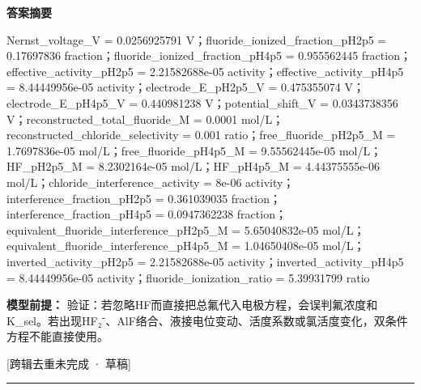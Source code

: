 \documentclass[UTF8,11pt,a4paper]{ctexart}
\begin{document}
\noindent\textbf{答案摘要}\par
Nernst\_voltage\_V = 0.0256925791 V；fluoride\_ionized\_fraction\_pH2p5 = 0.17697836 fraction；fluoride\_ionized\_fraction\_pH4p5 = 0.955562445 fraction；effective\_activity\_pH2p5 = 2.21582688e-05 activity；effective\_activity\_pH4p5 = 8.44449956e-05 activity；electrode\_E\_pH2p5\_V = 0.475355074 V；electrode\_E\_pH4p5\_V = 0.440981238 V；potential\_shift\_V = 0.0343738356 V；reconstructed\_total\_fluoride\_M = 0.0001 mol/L；reconstructed\_chloride\_selectivity = 0.001 ratio；free\_fluoride\_pH2p5\_M = 1.7697836e-05 mol/L；free\_fluoride\_pH4p5\_M = 9.55562445e-05 mol/L；HF\_pH2p5\_M = 8.2302164e-05 mol/L；HF\_pH4p5\_M = 4.44375555e-06 mol/L；chloride\_interference\_activity = 8e-06 activity；interference\_fraction\_pH2p5 = 0.361039035 fraction；interference\_fraction\_pH4p5 = 0.0947362238 fraction；equivalent\_fluoride\_interference\_pH2p5\_M = 5.65040832e-05 mol/L；equivalent\_fluoride\_interference\_pH4p5\_M = 1.04650408e-05 mol/L；inverted\_activity\_pH2p5 = 2.21582688e-05 activity；inverted\_activity\_pH4p5 = 8.44449956e-05 activity；fluoride\_ionization\_ratio = 5.39931799 ratio\par
\noindent\textbf{模型前提：}
验证：若忽略HF而直接把总氟代入电极方程，会误判氟浓度和K\_sel。若出现HF₂⁻、AlF络合、液接电位变动、活度系数或氯活度变化，双条件方程不能直接使用。\par
\noindent\textcolor{red!65!black}{[跨辑去重未完成 · 草稿]} \par
\medskip\hrule\medskip
{}
\end{document}
